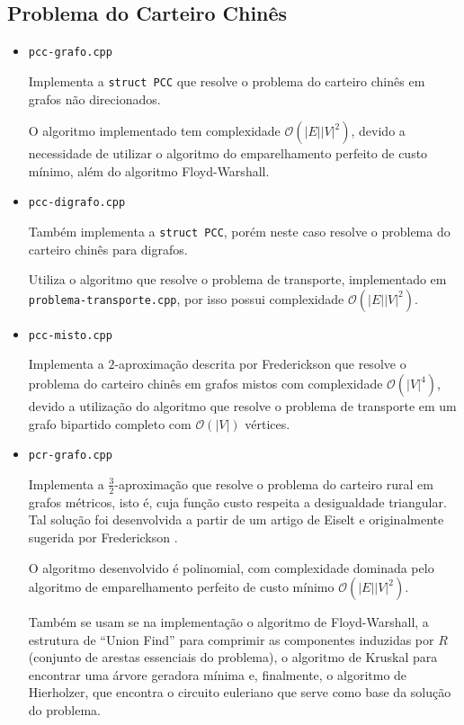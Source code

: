 \subsection{Problema do Carteiro Chinês}
\begin{itemize}
    \item \texttt{pcc-grafo.cpp}

        Implementa a \texttt{struct PCC} que resolve o problema do carteiro chinês em grafos não direcionados. 

        O algoritmo implementado tem complexidade $\mathcal{O}(|E||V|^2)$, devido a necessidade de utilizar o algoritmo do emparelhamento perfeito de custo mínimo, além do algoritmo Floyd-Warshall.
    \item \texttt{pcc-digrafo.cpp}

        Também implementa a \texttt{struct PCC}, porém neste caso resolve o problema do carteiro chinês para digrafos.

        Utiliza o algoritmo que resolve o problema de transporte, implementado em \texttt{problema-transporte.cpp}, por isso possui complexidade $\mathcal{O}(|E||V|^2)$.
    \item \texttt{pcc-misto.cpp}

        Implementa a $2$-aproximação descrita por Frederickson \cite{frederickson} que resolve o problema do carteiro chinês em grafos mistos com complexidade $\mathcal{O}(|V|^4)$, devido a utilização do algoritmo que resolve o problema de transporte em um grafo bipartido completo com $\mathcal{O}(|V|)$ vértices.

    \item \texttt{pcr-grafo.cpp}
        
        Implementa a $\frac{3}{2}$-aproximação que resolve o problema do carteiro rural em grafos métricos, isto é, cuja função custo respeita a desigualdade triangular.  
        Tal solução foi desenvolvida a partir de um artigo de Eiselt \cite{michel} e originalmente sugerida por Frederickson \cite{frederickson}.

        O algoritmo desenvolvido é polinomial, com complexidade dominada pelo algoritmo de emparelhamento perfeito de custo mínimo $\mathcal{O}(|E||V|^2)$.

        Também se usam se na implementação o algoritmo de Floyd-Warshall, a estrutura de ``Union Find'' para comprimir as componentes induzidas por $R$ (conjunto de arestas essenciais do problema), o algoritmo de Kruskal para encontrar uma árvore geradora mínima e, finalmente, o algoritmo de Hierholzer, que encontra o circuito euleriano que serve como base da solução do problema.
        

\end{itemize}
